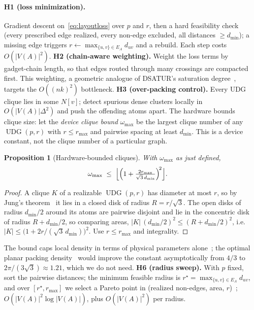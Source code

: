 \documentclass[a4paper,fleqn]{cas-sc}
\newtheorem{proposition}[theorem]{Proposition}
\newcommand{\UDG}{\operatorname{UDG}}
\begin{document}
\paragraph{H1 (loss minimization).} Gradient descent on~\eqref{eq:layoutloss} over
$p$ and $r$, then a hard feasibility check (every
prescribed edge realized, every non-edge excluded, all distances $\ge d_{\min}$); a
missing edge triggers $r\leftarrow\max_{\{u,v\}\in E_A}d_{uv}$ and a rebuild. Each step
costs $O(|V(A)|^2)$.
\textbf{H2 (chain-aware weighting).} Weight the loss terms by gadget-chain length, so
that edges routed through many crossings are compacted first. This weighting, a
geometric analogue of DSATUR's saturation degree~\cite{Brelaz1979}, targets the
$O((nk)^2)$ bottleneck.
\textbf{H3 (over-packing control).} Every UDG clique lies in some $N[v]$; detect
spurious dense clusters locally in $O(|V(A)|\Delta^2)$ and push the offending atoms
apart. The hardware bounds clique size: let the \emph{device clique bound}
$\omega_{\max}$ be the largest clique number of any $\UDG(p,r)$ with $r\le r_{\max}$ and
pairwise spacing at least $d_{\min}$. This is a device constant, not the clique number
of a particular graph.

\begin{proposition}[Hardware-bounded cliques]
\label{prop:hwclique}
With $\omega_{\max}$ as just defined,
\[
  \omega_{\max}\;\le\;\Bigl\lfloor\Bigl(1+\tfrac{2r_{\max}}
      {\sqrt{3}\,d_{\min}}\Bigr)^{\!2}\Bigr\rfloor .
\]
\end{proposition}

\begin{proof}
A clique $K$ of a realizable $\UDG(p,r)$ has diameter at most $r$, so by Jung's
theorem~\cite{Jung1901} it lies in a closed disk of radius $R=r/\sqrt3$. The open
disks of radius $d_{\min}/2$ around its atoms are pairwise disjoint and lie in the
concentric disk of radius $R+d_{\min}/2$, so comparing areas,
$|K|\,(d_{\min}/2)^2\le(R+d_{\min}/2)^2$, i.e.\
$|K|\le\bigl(1+2r/(\sqrt3\,d_{\min})\bigr)^2$. Use $r\le r_{\max}$ and integrality.
\end{proof}

\noindent The bound caps local density in terms of physical parameters
alone~\cite{Henriet2020,Scholl2021}; the optimal planar packing
density~\cite{FejesToth1953} would improve the constant asymptotically from $4/3$ to
$2\pi/(3\sqrt3)\approx1.21$, which we do not need.
\textbf{H6 (radius sweep).} With $p$ fixed, sort the pairwise distances; the minimum
feasible radius is $r^\star=\max_{\{u,v\}\in E_A}d_{uv}$, and over $[r^\star,r_{\max}]$
we select a Pareto point in (realized non-edges, area, $r$)~\cite{Miettinen1999};
$O(|V(A)|^2\log|V(A)|)$, plus $O(|V(A)|^2)$ per radius.
\end{document}
